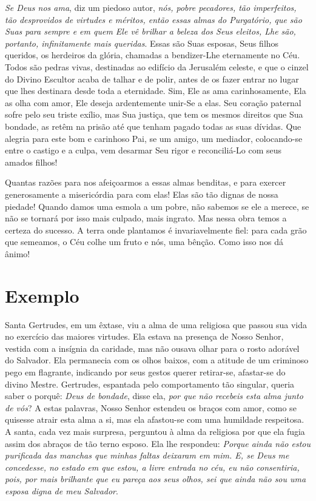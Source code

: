 \textit{Se Deus nos ama}, diz um piedoso autor, \textit{nós, pobre pecadores, tão imperfeitos, tão desprovidos de virtudes e méritos, então essas almas do Purgatório, que são Suas para sempre e em quem Ele vê brilhar a beleza dos Seus eleitos, Lhe são, portanto, infinitamente mais queridas}. Essas são Suas esposas, Seus filhos queridos, os herdeiros da glória, chamadas a bendizer-Lhe eternamente no Céu. Todos são pedras vivas, destinadas ao edifício da Jerusalém celeste, e que o cinzel do Divino Escultor acaba de talhar e de polir, antes de os fazer entrar no lugar que lhes destinara desde toda a eternidade. Sim, Ele as ama carinhosamente, Ela as olha com amor, Ele deseja ardentemente unir-Se a elas. Seu coração paternal sofre pelo seu triste exílio, mas Sua justiça, que tem os mesmos direitos que Sua bondade, as retêm na prisão até que tenham pagado todas as suas dívidas. Que alegria para este bom e carinhoso Pai, se um amigo, um mediador, colocando-se entre o castigo e a culpa, vem desarmar Seu rigor e reconciliá-Lo com seus amados filhos!

Quantas razões para nos afeiçoarmos a essas almas benditas, e para exercer generosamente a misericórdia para com elas! Elas são tão dignas de nossa piedade! Quando damos uma esmola a um pobre, não sabemos se ele a merece, se não se tornará por isso mais culpado, mais ingrato. Mas nessa obra temos a certeza do sucesso. A terra onde plantamos é invariavelmente fiel: para cada grão que semeamos, o Céu colhe um fruto e nós, uma bênção. Como isso nos dá ânimo!


\section*{Exemplo}

Santa Gertrudes, em um êxtase, viu a alma de uma religiosa que passou sua vida no exercício das maiores virtudes. Ela estava na presença de Nosso Senhor, vestida com a insígnia da caridade, mas não ousava olhar para o rosto adorável do Salvador. Ela permanecia com os olhos baixos, com a atitude de um criminoso pego em flagrante, indicando por seus gestos querer retirar-se, afastar-se do divino Mestre. Gertrudes, espantada pelo comportamento tão singular, queria saber o porquê: \textit{Deus de bondade}, disse ela, \textit{por que não recebeis esta alma junto de vós}? A estas palavras, Nosso Senhor estendeu os braços com amor, como se quisesse atrair esta alma a si, mas ela afastou-se com uma humildade respeitosa. A santa, cada vez mais surpresa, perguntou à alma da religiosa por que ela fugia assim dos abraços de tão terno esposo. Ela lhe respondeu: \textit{Porque ainda não estou purificada das manchas que minhas faltas deixaram em mim. E, se Deus me concedesse, no estado em que estou, a livre entrada no céu, eu não consentiria, pois, por mais brilhante que eu pareça aos seus olhos, sei que ainda não sou uma esposa digna de meu Salvador}.

